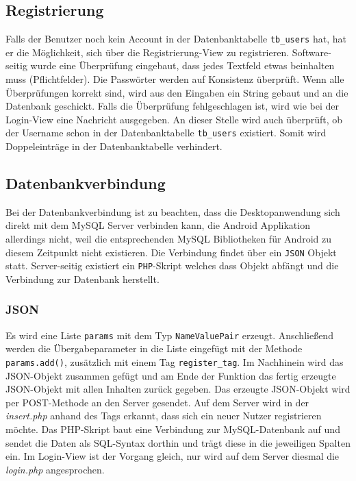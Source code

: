 \subsection{Registrierung}
Falls der Benutzer noch kein Account in der Datenbanktabelle \texttt{tb\_users} hat, hat er die Möglichkeit, sich über die Registrierung-View zu registrieren. Software-seitig wurde eine Überprüfung eingebaut, dass jedes Textfeld etwas beinhalten muss (Pflichtfelder). Die Passwörter werden auf Konsistenz überprüft. Wenn alle Überprüfungen korrekt sind, wird aus den Eingaben ein String gebaut und an die Datenbank geschickt. Falls die Überprüfung fehlgeschlagen ist, wird wie bei der Login-View eine Nachricht ausgegeben. An dieser Stelle wird auch überprüft, ob der Username schon in der Datenbanktabelle \texttt{tb\_users} existiert. Somit wird Doppeleinträge in der Datenbanktabelle verhindert.\\

\subsection{Datenbankverbindung}
Bei der Datenbankverbindung ist zu beachten, dass die Desktopanwendung sich direkt mit dem MySQL Server verbinden kann, die Android Applikation allerdings nicht, weil die entsprechenden MySQL Bibliotheken für Android zu diesem Zeitpunkt nicht existieren. Die Verbindung findet über ein \texttt{JSON} Objekt statt. Server-seitig existiert ein \texttt{PHP}-Skript welches dass Objekt abfängt und die Verbindung zur Datenbank herstellt.\\

\subsubsection{JSON}

Es wird eine Liste \texttt{params} mit dem Typ \texttt{NameValuePair} erzeugt. Anschließend werden die Übergabeparameter in die Liste eingefügt mit der Methode \texttt{params.add()}, zusätzlich mit einem Tag \texttt{register\_tag}. Im Nachhinein wird das JSON-Objekt zusammen gefügt und am Ende der Funktion das fertig erzeugte JSON-Objekt mit allen Inhalten zurück gegeben. Das erzeugte JSON-Objekt wird per POST-Methode an den Server gesendet. Auf dem Server wird in der \textit{insert.php} anhand des Tags erkannt, dass sich ein neuer Nutzer registrieren möchte. Das PHP-Skript baut eine Verbindung zur MySQL-Datenbank auf und sendet die Daten als SQL-Syntax dorthin und trägt diese in die jeweiligen Spalten ein. Im Login-View ist der Vorgang gleich, nur wird auf dem Server diesmal die \textit{login.php} angesprochen.\\

